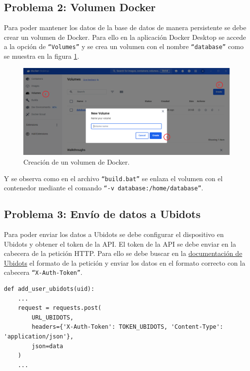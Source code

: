 \documentclass{article}
\begin{document}
\subsection{Problema 2: Volumen Docker}
Para poder mantener los datos de la base de datos de manera persistente se debe crear un volumen de Docker.
Para ello en la aplicación Docker Desktop se accede a la opción de \texttt{``Volumes''} y se crea un volumen con el nombre \texttt{``database''} como se muestra en la figura \ref{fig:volumen docker}.
\begin{figure}[H]
    \raggedright
    \includegraphics[width=1\linewidth]{../images/volumen_docker.png}
    \caption{\label{fig:volumen docker}Creación de un volumen de Docker.}
\end{figure}

Y se observa como en el archivo \texttt{``build.bat''} se enlaza el volumen con el contenedor mediante el comando \texttt{``-v database:/home/database''}.


\subsection{Problema 3: Envío de datos a Ubidots}
Para poder enviar los datos a Ubidots se debe configurar el dispositivo en Ubidots y obtener el token de la API.
El token de la API se debe enviar en la cabecera de la petición HTTP.
Para ello se debe buscar en la \href{https://docs.ubidots.com/reference/authentication}{documentación de Ubidots} el formato de la petición y enviar los datos en el formato correcto con la cabecera \texttt{``X-Auth-Token''}.
\begin{lstlisting}
def add_user_ubidots(uid):
    ...
    request = requests.post(
        URL_UBIDOTS,
        headers={'X-Auth-Token': TOKEN_UBIDOTS, 'Content-Type': 'application/json'},
        json=data
    )
    ...
\end{lstlisting}
\end{document}
